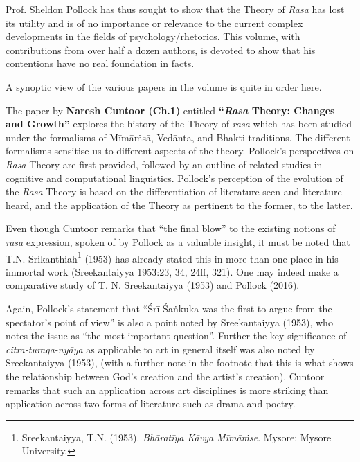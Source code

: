Prof. Sheldon Pollock has thus sought to show that the Theory of \textsl{Rasa} has lost its utility and is of no importance or relevance to the current complex developments in the fields of psychology/rhetorics. This volume, with contributions from over half a dozen authors, is devoted to show that his contentions have no real foundation in facts.

A synoptic view of the various papers in the volume is quite in order here.

The paper by {\bf Naresh Cuntoor (Ch.1)} entitled {\bf“\textsl{Rasa} Theory: Changes and Growth”} explores the history of the Theory of \textsl{rasa} which has been studied under the formalisms of Mīmāṁsā, Vedānta, and Bhakti traditions. The different formalisms sensitise us to different aspects of the theory. Pollock’s perspectives on \textsl{Rasa} Theory are first provided, followed by an outline of related studies in cognitive and computational linguistics. Pollock’s perception of the evolution of the \textsl{Rasa} Theory is based on the differentiation of literature seen and literature heard, and the application of the Theory as pertinent to the former, to the latter.

Even though Cuntoor remarks that “the final blow” to the existing notions of \textsl{rasa} expression, spoken of by Pollock as a valuable insight, it must be noted that T.N. Srikanthiah\footnote[1]{Sreekantaiyya, T.N. (1953). \textsl{Bhāratīya Kāvya Mīmāṁse}. Mysore: Mysore University.} (1953) has already stated this in more than one place in his immortal work (Sreekantaiyya 1953:23, 34, 24ff, 321). One may indeed make a comparative study of T. N. Sreekantaiyya (1953) and Pollock (2016).

Again, Pollock's statement that “Śrī Śaṅkuka was the first to argue from the spectator's point of view” is also a point noted by Sreekantaiyya (1953), who notes the issue as “the most important question”. Further the key significance of \textsl{citra-turaga-nyāya} as applicable to art in general itself was also noted by Sreekantaiyya (1953), (with a further note in the footnote that this is what shows the relationship between God's creation and the artist's creation). Cuntoor remarks that such an application across art disciplines is more striking than application across two forms of literature such as drama and poetry.

